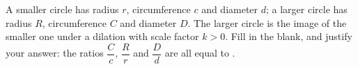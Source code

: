 A smaller circle has radius $r$, circumference $c$ and diameter $d$; a larger circle has radius $R$, circumference $C$ and diameter $D$. The larger circle is the image of the smaller one under a dilation with scale factor $k>0$. Fill in the blank, and justify your answer: the ratios $\dfrac Cc$, $\dfrac Rr$ and $\dfrac Dd$ are all equal to \underline{\hspace{1.5cm}}.
